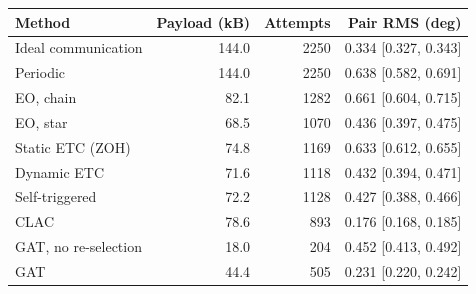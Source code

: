 \begin{tabular}{@{}lrrr@{}}
\toprule
Method & Payload (kB) & Attempts & Pair RMS (deg)\\
\midrule
Ideal communication & 144.0 & 2250 & 0.334 [0.327, 0.343]\\
Periodic & 144.0 & 2250 & 0.638 [0.582, 0.691]\\
EO, chain & 82.1 & 1282 & 0.661 [0.604, 0.715]\\
EO, star & 68.5 & 1070 & 0.436 [0.397, 0.475]\\
Static ETC (ZOH) & 74.8 & 1169 & 0.633 [0.612, 0.655]\\
Dynamic ETC & 71.6 & 1118 & 0.432 [0.394, 0.471]\\
Self-triggered & 72.2 & 1128 & 0.427 [0.388, 0.466]\\
CLAC & 78.6 & 893 & 0.176 [0.168, 0.185]\\
GAT, no re-selection & 18.0 & 204 & 0.452 [0.413, 0.492]\\
GAT & 44.4 & 505 & 0.231 [0.220, 0.242]\\
\bottomrule
\end{tabular}

